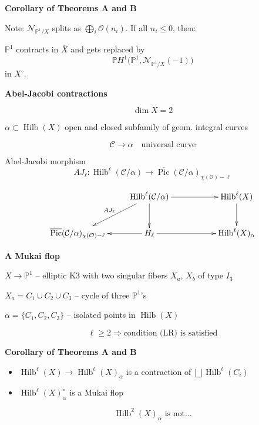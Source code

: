 \medskip\noindent
{\bf Corollary of Theorems A and B}

Note:
$\mathcal N_{\mathbb P^1/X}$ splits as
$\bigoplus_i\mathcal O(n_i)$.
If all $n_i\leq 0$, then:

$\mathbb P^1$ contracts in $\overline X$
and gets replaced by
$$
\mathbb P H^1
\bigl(
\mathbb P^1,
\mathcal N_{\mathbb P^1/X}(-1)
\bigr)
$$
in $X^\circ$.

\medskip\noindent
{\bf Abel-Jacobi contractions}

$$
\dim X=2
$$

$\alpha\subset\operatorname{Hilb}(X)$
open and closed subfamily of geom.
integral curves

$$
\mathcal C\longrightarrow\alpha
\quad\text{universal curve}
$$

Abel-Jacobi morphism
$$
AJ_\ell\colon
\operatorname{Hilb}^{\ell}(\mathcal C/\alpha)
\longrightarrow
\overline{\operatorname{Pic}}
(\mathcal C/\alpha)_{\chi(\mathcal O)-\ell}
$$

$$
\xymatrix@C=24pt@R=26pt{
&
\operatorname{Hilb}^{\ell}(\mathcal C/\alpha)
\ar[rr]
\ar[dl]_{AJ_\ell}
\ar[d]
&&
\operatorname{Hilb}^{\ell}(X)
\ar[d]
\\
\overline{\operatorname{Pic}}
(\mathcal C/\alpha)_{\chi(\mathcal O)-\ell}
&
H_\ell
\ar[l]
\ar[rr]
&&
\operatorname{Hilb}^{\ell}(X)_\alpha
}
$$

\medskip\noindent
{\bf A Mukai flop}

$X\longrightarrow\mathbb P^1$ -- elliptic
K3 with two singular fibers $X_a$, $X_b$
of type $I_3$

$X_a=C_1\cup C_2\cup C_3$ -- cycle of
three $\mathbb P^1$'s

$\alpha=\{C_1,C_2,C_3\}$ -- isolated
points in $\operatorname{Hilb}(X)$

$$
\ell\geq 2
\Longrightarrow
\text{condition (LR) is satisfied}
$$

\medskip\noindent
{\bf Corollary of Theorems A and B}

\begin{itemize}
\item
$\operatorname{Hilb}^{\ell}(X)
\longrightarrow
\operatorname{Hilb}^{\ell}(X)_\alpha$
is a contraction of
$\bigsqcup\operatorname{Hilb}^{\ell}(C_i)$

\item
$\operatorname{Hilb}^{\ell}(X)^\circ_\alpha$
is a Mukai flop
\end{itemize}

$$
\operatorname{Hilb}^{2}(X)_\alpha
\text{ is not\ldots}
$$

